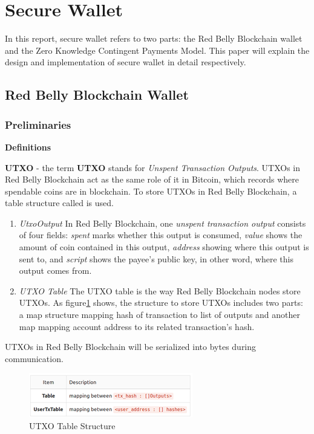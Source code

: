 \documentclass[12pt]{article}
\begin{document}
\section{Secure Wallet}

In this report, secure wallet refers to two parts: the Red Belly Blockchain wallet and the Zero Knowledge Contingent Payments Model. This paper will explain the design and implementation of secure wallet in detail respectively.

\subsection{Red Belly Blockchain Wallet}

\subsubsection{Preliminaries}

\textbf{Definitions\\}

\textbf{UTXO} - the term \textbf{UTXO} stands for \textit{Unspent Transaction Outputs}. UTXOs in Red Belly Blockchain act as the same role of it in Bitcoin, which records where spendable coins are in blockchain. To store UTXOs in Red Belly Blockchain, a table structure called  is used.

\begin{enumerate}
    \item \textit{UtxoOutput} In Red Belly Blockchain, one \textit{unspent transaction output} consists of four fields: \textit{spent} marks whether this output is consumed, \textit{value} shows the amount of coin contained in this output, \textit{address} showing where this output is sent to, and \textit{script} shows the payee's public key, in other word, where this output comes from.

    \item \textit{UTXO Table} The UTXO table is the way Red Belly Blockchain nodes store UTXOs. As figure\ref{fig:utxo_table} shows, the structure to store UTXOs includes two parts: a map structure mapping hash of transaction to list of outputs and another map mapping account address to its related transaction's hash.
\end{enumerate}

UTXOs in Red Belly Blockchain will be serialized into bytes during communication.
\\

\begin{figure}
    \centering
    \includegraphics{utxo_table.png}
    \caption{UTXO Table Structure}
    \label{fig:utxo_table}
\end{figure}
\end{document}
